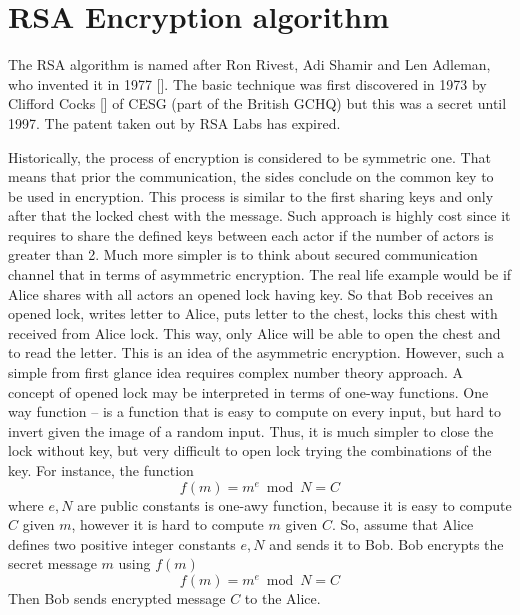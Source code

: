 \documentclass[12pt,letterpaper,oneside,reqno]{amsart}
\begin{document}


    \section{RSA Encryption algorithm}\label{sec:rsa-encryption-algorithm}
    The RSA algorithm is named after Ron Rivest, Adi Shamir and Len Adleman, who invented it in 1977 [\cite{rivest1978method}].
    The basic technique was first discovered in 1973 by Clifford Cocks [\cite{cocks1973note}] of CESG (part of the British GCHQ)
    but this was a secret until 1997.
    The patent taken out by RSA Labs has expired.

    Historically, the process of encryption is considered to be symmetric one.
    That means that prior the communication, the sides conclude on the common key to be used in encryption.
    This process is similar to the first sharing keys and only after that the locked chest with the message.
    Such approach is highly cost since it requires to share the defined keys between each actor if the number of actors
    is greater than 2.
    Much more simpler is to think about secured communication channel that in terms of asymmetric encryption.
    The real life example would be if Alice shares with all actors an opened lock having key.
    So that Bob receives an opened lock, writes letter to Alice, puts letter to the chest, locks this chest with received
    from Alice lock.
    This way, only Alice will be able to open the chest and to read the letter.
    This is an idea of the asymmetric encryption.
    However, such a simple from first glance idea requires complex number theory approach.
    A concept of opened lock may be interpreted in terms of one-way functions.
    One way function -- is a function that is easy to compute on every input, but hard to invert given the image of
    a random input.
    Thus, it is much simpler to close the lock without key, but very difficult to open lock trying the combinations
    of the key.
    For instance, the function
    \begin{equation*}
        f(m) = m^e \bmod N = C
    \end{equation*}
    where $e, N$ are public constants is one-awy function,
    because it is easy to compute $C$ given $m$, however it is hard to compute $m$ given $C$.
    So, assume that Alice defines two positive integer constants $e, N$ and sends it to Bob.
    Bob encrypts the secret message $m$ using $f(m)$
    \[
        f(m) = m^e \bmod N = C
    \]
    Then Bob sends encrypted message $C$ to the Alice.
\end{document}

